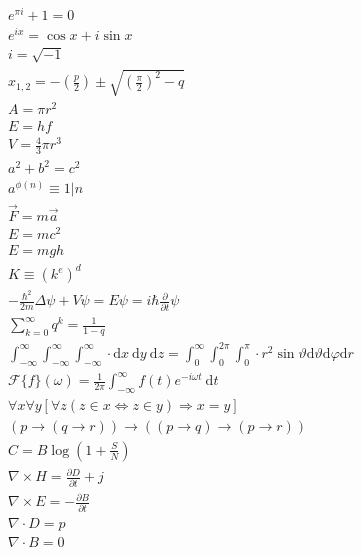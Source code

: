 \documentclass[11pt,a4paper]{article}
\begin{document}
\begin{gather*}
e^{\pi i}+1=0\\
e^{ix}=\cos{x}+i\sin{x}\\
i=\sqrt{-1}\\
x_{1,2}=-\left(\frac{p}{2}\right)\pm\sqrt{\left(\frac{\pi}{2}\right)^2-q}\\
A=\pi r^2\\
E=hf\\
V=\frac{4}{3}\pi r^3\\
a^2+b^2=c^2\\
a^{\phi(n)}\equiv 1|n\\
\vec{F}=m\vec{a}\\
E=mc^2\\
E=mgh\\
K\equiv \left(k^e\right)^d\\
-\frac{\hbar^2}{2 m} \Delta \psi+V \psi=E \psi=i \hbar \frac{\partial}{\partial t} \psi\\
\sum_{k=0}^{\infty}{q^k}=\frac{1}{1-q}\\
\int_{-\infty}^{\infty} \int_{-\infty}^{\infty} \int_{-\infty}^{\infty} \cdot \mathrm{d} x \mathrm{~d} y \mathrm{~d} z=\int_0^{\infty} \int_0^{2 \pi} \int_0^\pi \cdot r^2 \sin \vartheta \mathrm{d} \vartheta \mathrm{d} \varphi \mathrm{d} r\\
\mathcal{F}\{f\}(\omega)=\frac{1}{2 \pi} \int_{-\infty}^{\infty} f(t) e^{-i \omega t} \mathrm{~d} t\\
\forall x \forall y[\forall z(z \in x \Leftrightarrow z \in y) \Rightarrow x=y]\\
(p \rightarrow(q \rightarrow r)) \rightarrow((p \rightarrow q) \rightarrow(p \rightarrow r))\\
C=B\log{\left(1+\frac{S}{N}\right)}\\
\nabla\times H=\frac{\partial D}{\partial t}+j\\
\nabla\times E=-\frac{\partial B}{\partial t}\\
\nabla\cdot D=p\\
\nabla\cdot B=0
\end{gather*}
\end{document}
